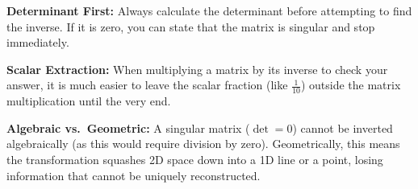 \begin{takeaways}
\item \textbf{Determinant First:} Always calculate the determinant before attempting to find the inverse. If it is zero, you can state that the matrix is singular and stop immediately.
\item \textbf{Scalar Extraction:} When multiplying a matrix by its inverse to check your answer, it is much easier to leave the scalar fraction (like $\frac{1}{10}$) outside the matrix multiplication until the very end.
\item \textbf{Algebraic vs.\ Geometric:} A singular matrix ($\det = 0$) cannot be inverted algebraically (as this would require division by zero). Geometrically, this means the transformation squashes 2D space down into a 1D line or a point, losing information that cannot be uniquely reconstructed.
\end{takeaways}
